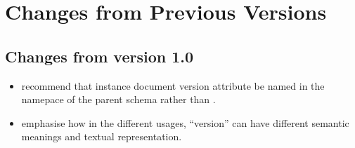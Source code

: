 \documentclass[10pt,a4paper]{ivoa}
\begin{document}
\appendix


\section{Changes from Previous Versions}

\subsection{Changes from version 1.0}
\begin{itemize}
  \item recommend that instance document version attribute be named
   in the namepace of the parent schema rather than
  .
  \item emphasise how in the different usages, ``version'' can have different
  semantic meanings and textual representation.
\end{itemize}


\end{document}
